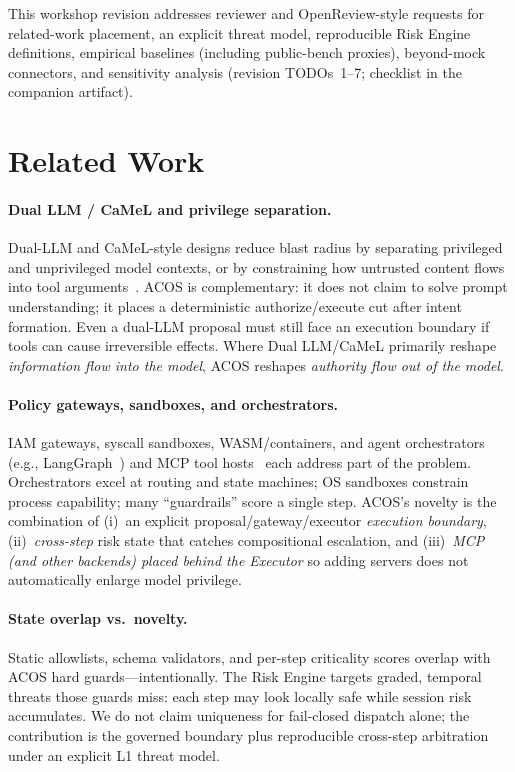 \documentclass{article}
\begin{document}
This workshop revision addresses reviewer and OpenReview-style requests for
related-work placement, an explicit threat model, reproducible Risk Engine
definitions, empirical baselines (including public-bench proxies),
beyond-mock connectors, and sensitivity analysis (revision TODOs~1--7;
checklist in the companion artifact).

\section{Related Work}
\label{sec:related}

\paragraph{Dual LLM / CaMeL and privilege separation.}
Dual-LLM and CaMeL-style designs reduce blast radius by separating privileged
and unprivileged model contexts, or by constraining how untrusted content
flows into tool arguments~\citep{camel2024}. ACOS is complementary: it does
not claim to solve prompt understanding; it places a deterministic
authorize/execute cut after intent formation. Even a dual-LLM proposal must
still face an execution boundary if tools can cause irreversible effects.
Where Dual LLM/CaMeL primarily reshape \emph{information flow into the model},
ACOS reshapes \emph{authority flow out of the model}.

\paragraph{Policy gateways, sandboxes, and orchestrators.}
IAM gateways, syscall sandboxes, WASM/containers, and agent orchestrators
(e.g., LangGraph~\citep{langgraph}) and MCP tool hosts~\citep{mcp2024} each
address part of the problem. Orchestrators excel at routing and state
machines; OS sandboxes constrain process capability; many ``guardrails''
score a single step. ACOS's novelty is the combination of (i)~an explicit
proposal/gateway/executor \emph{execution boundary}, (ii)~\emph{cross-step}
risk state that catches compositional escalation, and (iii)~\emph{MCP (and
other backends) placed behind the Executor} so adding servers does not
automatically enlarge model privilege.

\paragraph{State overlap vs.\ novelty.}
Static allowlists, schema validators, and per-step criticality scores overlap
with ACOS hard guards---intentionally. The Risk Engine targets graded,
temporal threats those guards miss: each step may look locally safe while
session risk accumulates. We do not claim uniqueness for fail-closed
dispatch alone; the contribution is the governed boundary plus reproducible
cross-step arbitration under an explicit L1 threat model.
\end{document}
